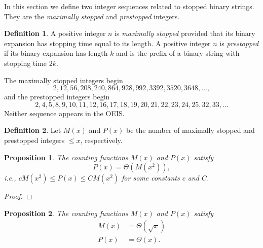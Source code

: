 \documentclass[12pt]{amsart}
\newtheorem{proposition}{Proposition}
\theoremstyle{definition}
\newtheorem{definition}{Definition}
\begin{document}
In this section we define two integer sequences related to stopped binary
strings. They are the \emph{maximally stopped} and \emph{prestopped} integers.

\begin{definition}
    A positive integer $n$ is \emph{maximally stopped} provided that its binary
    expansion has stopping time equal to its length. A positive integer $n$ is
    \emph{prestopped} if its binary expansion has length $k$ and is the prefix
    of a binary string with stopping time $2k$.
\end{definition}

The maximally stopped integers begin
\begin{equation*}
    2, 12, 56, 208, 240, 864, 928, 992, 3392, 3520, 3648, \dots,
\end{equation*}
and the prestopped integers begin
\begin{equation*}
    2, 4, 5, 8, 9, 10, 11, 12, 16, 17, 18, 19, 20, 21, 22, 23, 24, 25, 32, 33, \dots
\end{equation*}
Neither sequence appears in the OEIS.

\begin{definition}
    Let $M(x)$ and $P(x)$ be the number of maximally stopped and prestopped
    integers $\leq x$, respectively.
\end{definition}

\begin{proposition}
    The counting functions $M(x)$ and $P(x)$ satisfy
    \begin{equation*}
        P(x) = \Theta(M(x^2)),
    \end{equation*}
    i.e., $cM(x^2) \leq P(x) \leq C M(x^2)$ for some constants $c$ and $C$.
\end{proposition}

\begin{proof}
\end{proof}

\begin{proposition}
    The counting functions $M(x)$ and $P(x)$ satisfy
    \begin{align*}
        M(x) &= \Theta(\sqrt{x}) \\
        P(x) &= \Theta(x).
    \end{align*}
\end{proposition}
\end{document}

